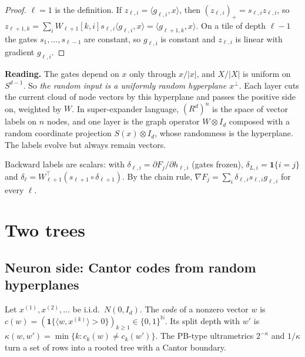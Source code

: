 \documentclass[11pt]{article}
\theoremstyle{definition}
\theoremstyle{remark}
\newcommand{\N}{\mathbb N}
\begin{document}
\begin{proof}
$\ell=1$ is the definition. If $z_{\ell,i}=\langle g_{\ell,i},x\rangle$, then $(z_{\ell,i})_+=s_{\ell,i}z_{\ell,i}$, so $z_{\ell+1,k}=\sum_iW_{\ell+1}[k,i]s_{\ell,i}\langle g_{\ell,i},x\rangle=\langle g_{\ell+1,k},x\rangle$. On a tile of depth $\ell-1$ the gates $s_1,\dots,s_{\ell-1}$ are constant, so $g_{\ell,i}$ is constant and $z_{\ell,i}$ is linear with gradient $g_{\ell,i}$.
\end{proof}

\textbf{Reading.} The gates depend on $x$ only through $x/|x|$, and $X/|X|$ is uniform on $S^{d-1}$. So \emph{the random input is a uniformly random hyperplane $x^\perp$}. Each layer cuts the current cloud of node vectors by this hyperplane and passes the positive side on, weighted by $W$. In super-expander language, $(R^d)^n$ is the space of vector labels on $n$ nodes, and one layer is the graph operator $W\otimes I_d$ composed with a random coordinate projection $S(x)\otimes I_d$, whose randomness is the hyperplane. The labels evolve but always remain vectors.

Backward labels are scalars: with $\delta_{\ell,i}=\partial F_j/\partial h_{\ell,i}$ (gates frozen), $\delta_{L,i}=\mathbf 1\{i=j\}$ and $\delta_\ell=W_{\ell+1}^{\top}(s_{\ell+1}\circ\delta_{\ell+1})$. By the chain rule, $\nabla F_j=\sum_i\delta_{\ell,i}s_{\ell,i}g_{\ell,i}$ for every $\ell$.

\section{Two trees}

\subsection{Neuron side: Cantor codes from random hyperplanes}

Let $x^{(1)},x^{(2)},\dots$ be i.i.d.\ $N(0,I_d)$. The \emph{code} of a nonzero vector $w$ is $c(w)=(\mathbf 1\{\langle w,x^{(k)}\rangle>0\})_{k\ge1}\in\{0,1\}^{\N}$. Its split depth with $w'$ is $\kappa(w,w')=\min\{k:c_k(w)\ne c_k(w')\}$. The PB-type ultrametrics $2^{-\kappa}$ and $1/\kappa$ turn a set of rows into a rooted tree with a Cantor boundary.
\end{document}
